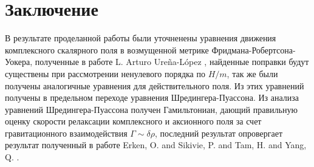 \setcounter{equation}{0}

\section{Заключение}\label{slast}
\qquad В результате проделанной работы были уточненены уравнения движения комплексного скалярного поля в возмущенной метрике Фридмана-Робертсона-Уокера, полученные в работе L. Arturo Ureña-López \cite{SF}, найденные поправки будут существены при рассмотрении ненулевого порядка по $H/m$, так же были получены аналогичные уравнения для действительного поля. Из этих уравнений получены в предельном переходе уравнения Шредингера-Пуассона. Из анализа уравнений Шредингера-Пуассона получен Гамильтониан, дающий правильную оценку скорости релаксации комплексного и аксионного поля за счет гравитационного взаимодействия $\Gamma\sim\delta\rho$, последний результат опровергает результат полученный в работе Erken, O. and Sikivie, P. and Tam, H. and Yang, Q. \cite{Sikivie}.

\pagebreak[4]